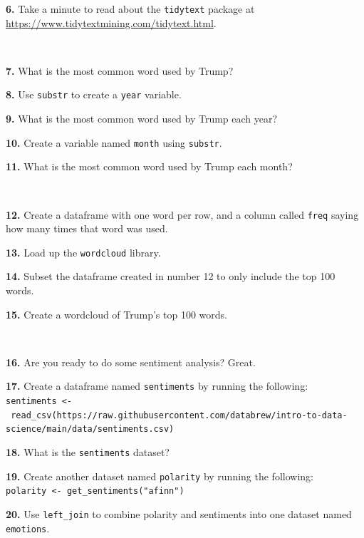 \documentclass[]{book}
\newenvironment{Shaded}{\begin{snugshade}}{\end{snugshade}}
\newcommand{\KeywordTok}[1]{\textcolor[rgb]{0.13,0.29,0.53}{\textbf{#1}}}
\newcommand{\NormalTok}[1]{#1}
\newcommand{\OperatorTok}[1]{\textcolor[rgb]{0.81,0.36,0.00}{\textbf{#1}}}
\newcommand{\StringTok}[1]{\textcolor[rgb]{0.31,0.60,0.02}{#1}}
\begin{document}
\textbf{6.} Take a minute to read about the \texttt{tidytext} package at \url{https://www.tidytextmining.com/tidytext.html}.

~

\textbf{7.} What is the most common word used by Trump?

\textbf{8.} Use \texttt{substr} to create a \texttt{year} variable.

\textbf{9.} What is the most common word used by Trump each year?

\textbf{10.} Create a variable named \texttt{month} using \texttt{substr}.

\textbf{11.} What is the most common word used by Trump each month?

~

\textbf{12.} Create a dataframe with one word per row, and a column called \texttt{freq} saying how many times that word was used.

\textbf{13.} Load up the \texttt{wordcloud} library.

\textbf{14.} Subset the dataframe created in number 12 to only include the top 100 words.

\textbf{15.} Create a wordcloud of Trump's top 100 words.

~

\textbf{16.} Are you ready to do some sentiment analysis? Great.

\textbf{17.} Create a dataframe named \texttt{sentiments} by running the following: \texttt{sentiments\ \textless{}-\ read\_csv(\textquotesingle{}https://raw.githubusercontent.com/databrew/intro-to-data-science/main/data/sentiments.csv\textquotesingle{})}

\textbf{18.} What is the \texttt{sentiments} dataset?

\textbf{19.} Create another dataset named \texttt{polarity} by running the following: \texttt{polarity\ \textless{}-\ get\_sentiments("afinn")}

\textbf{20.} Use \texttt{left\_join} to combine polarity and sentiments into one dataset named \texttt{emotions}.

\begin{Shaded}
\end{Shaded}
\end{document}
